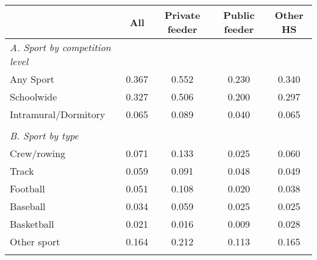 \begin{tabular}{l*{4}{c}}
\toprule
& All& Private feeder& Public feeder& Other HS\\
\midrule
\emph{A. Sport by competition level}\\
Any Sport& 0.367& 0.552& 0.230& 0.340\\
Schoolwide& 0.327& 0.506& 0.200& 0.297\\
Intramural/Dormitory& 0.065& 0.089& 0.040& 0.065\\
\\[-1.0em]
\emph{B. Sport by type}\\
Crew/rowing& 0.071& 0.133& 0.025& 0.060\\
Track& 0.059& 0.091& 0.048& 0.049\\
Football& 0.051& 0.108& 0.020& 0.038\\
Baseball& 0.034& 0.059& 0.025& 0.025\\
Basketball& 0.021& 0.016& 0.009& 0.028\\
Other sport& 0.164& 0.212& 0.113& 0.165\\
\\[-1.0em]
\bottomrule
\end{tabular}
